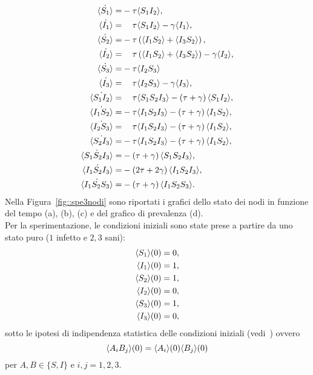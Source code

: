 \begin{equation}
\label{3nodi}
\begin{aligned}
	\dot{\angol {S_1}} =& -\tau \angol{ S_1 I_2},
\\ 
	\dot{\angol {I_1}} =&\spa \tau \angol{ S_1 I_2}-\gamma \angol{I_1}, 
\\ 
	\dot{\angol {S_2}} = & -\tau \tonde{ \angol{ I_1 S_2}+ \angol{I_3S_2}},
\\
	\dot{\angol {I_2}} = &\spa \tau \tonde{ \angol{ I_1 S_2} + \angol{I_3S_2}}-\gamma \angol{I_2}, 
\\ 
	\dot{\angol {S_3}} = & -\tau \angol{ I_2 S_3}
\\
	\dot{\angol {I_3}} = & \spa \tau  \angol{ I_2 S_3}-\gamma \angol{I_3},	
\\
	\dot{\angol{S_1I_2}}=& \spa\tau\angol{S_1S_2I_3} - \tonde{ \tau + \gamma}\angol{S_1 I_2},
\\
	\dot{\angol{I_1S_2}}=&-\tau\angol{I_1S_2I_3} - \tonde{ \tau + \gamma}\angol{I_1 S_2},
\\ 
	\dot{\angol{I_2S_3}}=&\spa\tau\angol{I_1S_2I_3} - \tonde{ \tau + \gamma}\angol{I_1 S_2},
\\
	\dot{\angol{S_2I_3}}=&-\tau\angol{I_1S_2I_3} - \tonde{ \tau + \gamma}\angol{I_1 S_2},
\\
	\dot{\angol{S_1S_2I_3}}=&-\tonde{\tau + \gamma}\angol{S_1S_2I_3},
\\
	\dot{\angol{I_1S_2I_3}}=&-\tonde{2\tau + 2\gamma}\angol{I_1S_2I_3},
\\
	\dot{\angol{I_1S_2S_3}}=&-\tonde{\tau + \gamma}\angol{I_1S_2S_3}.
 \end{aligned}
\end{equation}
Nella Figura~\ref{fig::spe3nodi} sono riportati i grafici dello stato dei nodi in funzione del tempo (a), (b), (c) e del grafico di prevalenza (d).\\
Per la sperimentazione, le condizioni iniziali sono state prese a partire da uno stato puro ($1$ infetto e $2,3$ sani):
\begin{equation}
\label{statipuri}
\begin{aligned}
\langle S_1 \rangle(0)&=0, \\
\langle I_1 \rangle(0) &=1, \\
\langle S_2 \rangle(0)&=1,\\
\langle I_2 \rangle(0)& = 0,\\ 
\langle S_3 \rangle(0)&= 1,\\
\langle I_3 \rangle(0) &= 0,\\
\end{aligned}
\end{equation}
sotto le ipotesi di indipendenza statistica delle condizioni iniziali (vedi~\cite{MR3340258}) ovvero
$$
\langle A_i B_j \rangle(0) =\langle A_i \rangle(0) \langle B_j \rangle(0)$$ 
per $A,B\in \{ S, I\}$ e  $i,j=1, 2,3$.\\

